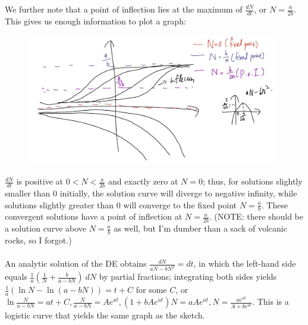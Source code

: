 \documentclass{article}
\begin{document}
We further note that a point of inflection lies at the maximum of $\frac{dN}{dt}$, or $N = \frac{a}{2b}$. This gives us enough information to plot a graph:
\begin{figure}[h]
    \centering
    \includegraphics[width=11cm]{DE-ch2-10-1.jpg}
\end{figure}\newpage
$\frac{dN}{dt}$ is positive at $0<N< \frac{a}{2b}$ and exactly zero at $N=0$; thus, for solutions slightly smaller than 0 initially, the solution curve will diverge to negative infinity, while solutions slightly greater than 0 will converge to the fixed point $N=\frac{a}{b}$. These convergent solutions have a point of inflection at $N=\frac{a}{2b}$. (NOTE: there should be a solution curve above $N = \frac{a}{b}$ as well, but I'm dumber than a sack of volcanic rocks, so I forgot.)\\ \\
An analytic solution of the DE obtains $\frac{dN}{aN-bN^2} = dt$, in which the left-hand side equals $\frac{1}{a}(\frac{1}{N}+\frac{b}{a-bN})\ dN$ by partial fractions; integrating both sides yields $\frac{1}{a}(\ln N - \ln (a - bN)) = t + C$ for some $C$, or $\ln \frac{N}{a-bN} = at + C, \frac{N}{a-bN} = Ae^{at}, (1+bAe^{at})N = aAe^{at}, N = \frac{ae^{at}}{A+be^{at}}$. This is a logistic curve that yields the same graph as the sketch. \\

\hrulefill
\end{document}
